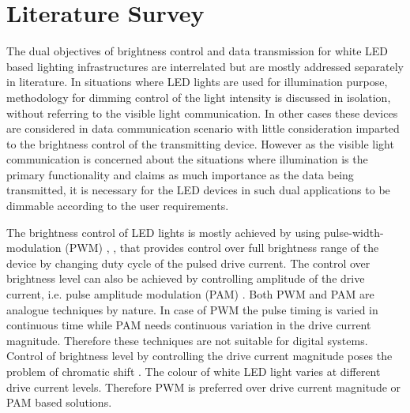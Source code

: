 
\chapter{Literature Survey} %
\label{Chapter2}





The dual objectives of brightness control and data transmission for white LED based lighting infrastructures are interrelated but are mostly addressed separately in literature. In situations where LED lights are used for illumination purpose, methodology for dimming control of the light intensity is discussed in isolation, without referring to the visible light communication. In other cases these devices are considered in data communication scenario with little consideration imparted to the brightness control of the transmitting device. However as the visible light communication is concerned about the situations where illumination is the primary functionality and claims as much importance as the data being transmitted, it is necessary for the LED devices in such dual applications to be dimmable according to the user requirements.

The brightness control of LED lights is mostly achieved by using pulse-width-modulation (PWM) \cite{doshi2010control}, \cite{mick2006led} \cite{garcia2009dimming}, that provides control over full brightness range of the device by changing duty cycle of the pulsed drive current. The control over brightness level can also be achieved by controlling amplitude of the drive current, i.e. pulse amplitude modulation (PAM) \cite{fang2009apc}. Both PWM and PAM are analogue techniques by nature. In case of PWM the pulse timing is varied in continuous time while PAM needs continuous variation in the drive current magnitude. Therefore these techniques are not suitable for digital systems. Control of brightness level by controlling the drive current magnitude poses the problem of chromatic shift \cite{dyble2005impact} \cite{levada2006high}. The colour of white LED light varies at different drive current levels. Therefore PWM is preferred over drive current magnitude or PAM based solutions.

